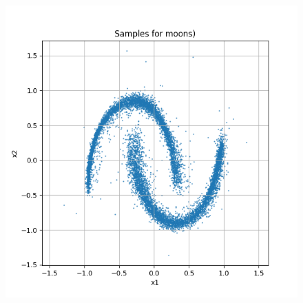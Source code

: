 \documentclass[a4paper,12pt]{article}
\begin{document}
\begin{figure}[H]
\begin{minipage}{0.3\textwidth}
  \end{minipage}
  \begin{minipage}{0.3\textwidth}
      \centering
      \includegraphics[width=\linewidth]{"images/Samples for ddpm_2_50_0.0001_0.02_moons.png"}
  \end{minipage}

  \vspace{0.5cm}


\end{figure}
\end{document}
